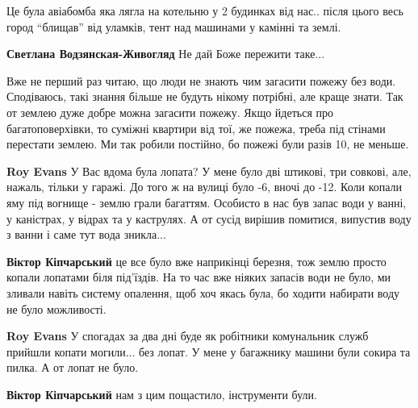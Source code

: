 Це була авіабомба яка лягла на котельню у 2 будинках від нас.. після цього весь
город \enquote{блищав} від уламків, тент над машинами у камінні та землі.

\begin{itemize} %
\textbf{Светлана Водзянская-Живогляд} Не дай Боже пережити таке...
\end{itemize} %


Вже не перший раз читаю, що люди не знають чим загасити пожежу без води.
Сподіваюсь, такі знання більше не будуть нікому потрібні, але краще знати. Так
от землею дуже добре можна загасити пожежу. Якщо йдеться про багатоповерхівки,
то суміжні квартири від тої, же пожежа, треба під стінами перестати землею. Ми
так робили постійно, бо пожежі були разів 10, не меньше.

\begin{itemize} %
\textbf{Roy Evans} У Вас вдома була лопата? У мене було дві штикові, три совкові, але, нажаль, тільки у гаражі.
До того ж на вулиці було -6, вночі до -12.
Коли копали яму під вогнище - землю грали багаттям.
Особисто в нас був запас води у ванні, у каністрах, у відрах та у каструлях.
А от сусід вирішив помитися, випустив воду з ванни і саме тут вода зникла...

\textbf{Віктор Кіпчарський} це все було вже наприкінці березня, тож землю просто копали лопатами біля під'їздів. На то час вже ніяких запасів води не було, ми зливали навіть систему опалення, щоб хоч якась була, бо ходити набирати воду не було можливості.

\textbf{Roy Evans} У спогадах за два дні буде як робітники комунальник служб прийшли копати могили... без лопат.
У мене у багажнику машини були сокира та пилка. А от лопат не було.

\textbf{Віктор Кіпчарський} нам з цим пощастило, інструменти були.
\end{itemize} %
